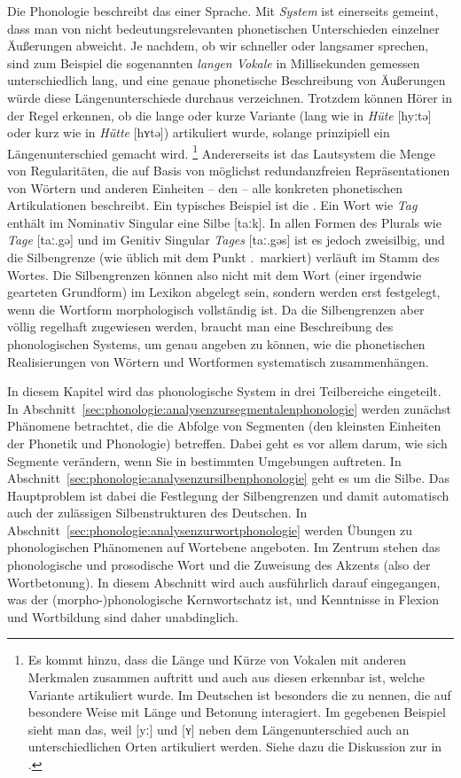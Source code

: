 Die Phonologie beschreibt das  einer Sprache.
Mit \textit{System} ist einerseits gemeint, dass man von nicht bedeutungsrelevanten phonetischen Unterschieden einzelner Äußerungen abweicht.
Je nachdem, ob wir schneller oder langsamer sprechen, sind zum Beispiel die sogenannten \textit{langen Vokale} in Millisekunden gemessen unterschiedlich lang, und eine genaue phonetische Beschreibung von Äußerungen würde diese Längenunterschiede durchaus verzeichnen.
Trotzdem können Hörer in der Regel erkennen, ob die lange oder kurze Variante (lang wie in \textit{Hüte} [hyːtə] oder kurz wie in \textit{Hütte} [hʏtə]) artikuliert wurde, solange prinzipiell ein Längenunterschied gemacht wird.%
\footnote{Es kommt hinzu, dass die Länge und Kürze von Vokalen mit anderen Merkmalen zusammen auftritt und auch aus diesen erkennbar ist, welche Variante artikuliert wurde.
Im Deutschen ist besonders die  zu nennen, die auf besondere Weise mit Länge und Betonung interagiert.
Im gegebenen Beispiel sieht man das, weil [yː] und [ʏ] neben dem Längenunterschied auch an unterschiedlichen Orten artikuliert werden.
Siehe dazu die Diskussion zur  in .}
Andererseits ist das Lautsystem die Menge von Regularitäten, die auf Basis von möglichst redundanzfreien Repräsentationen von Wörtern und anderen Einheiten -- den  -- alle konkreten phonetischen Artikulationen beschreibt.
Ein typisches Beispiel ist die .
Ein Wort wie \textit{Tag} enthält im Nominativ Singular eine Silbe [taːk].
In allen Formen des Plurals wie \textit{Tage} [taː.gə] und im Genitiv Singular \textit{Tages} [taː.gəs] ist es jedoch zweisilbig, und die Silbengrenze (wie üblich mit dem Punkt .\ markiert) verläuft im Stamm des Wortes.
Die Silbengrenzen können also nicht mit dem Wort (einer irgendwie gearteten Grundform) im Lexikon abgelegt sein, sondern werden erst festgelegt, wenn die Wortform morphologisch vollständig ist.
Da die Silbengrenzen aber völlig regelhaft zugewiesen werden, braucht man eine Beschreibung des phonologischen Systems, um genau angeben zu können, wie die phonetischen Realisierungen von Wörtern und Wortformen systematisch zusammenhängen.

In diesem Kapitel wird das phonologische System in drei Teilbereiche eingeteilt.
In Abschnitt~\ref{sec:phonologie:analysenzursegmentalenphonologie} werden zunächst Phänomene betrachtet, die die Abfolge von Segmenten (den kleinsten Einheiten der Phonetik und Phonologie) betreffen.
Dabei geht es vor allem darum, wie sich Segmente verändern, wenn Sie in bestimmten Umgebungen auftreten.
In Abschnitt~\ref{sec:phonologie:analysenzursilbenphonologie} geht es um die Silbe.
Das Hauptproblem ist dabei die Festlegung der Silbengrenzen und damit automatisch auch der zulässigen Silbenstrukturen des Deutschen.
In Abschnitt~\ref{sec:phonologie:analysenzurwortphonologie} werden Übungen zu phonologischen Phänomenen auf Wortebene angeboten.
Im Zentrum stehen das phonologische und prosodische Wort und die Zuweisung des Akzents (also der Wortbetonung).
In diesem Abschnitt wird auch ausführlich darauf eingegangen, was der (morpho-)phonologische Kernwortschatz ist, und Kenntnisse in Flexion und Wortbildung sind daher unabdinglich.


